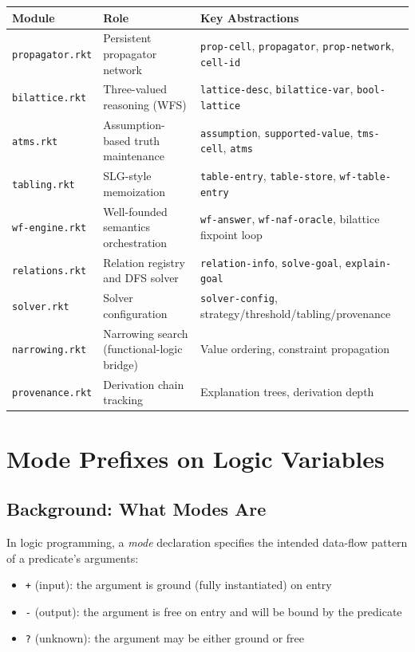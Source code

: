 \documentclass[11pt]{article}
\begin{document}
\begin{center}
\begin{tabular}{lll}
Module & Role & Key Abstractions\\
\hline
\texttt{propagator.rkt} & Persistent propagator network & \texttt{prop-cell}, \texttt{propagator}, \texttt{prop-network}, \texttt{cell-id}\\
\texttt{bilattice.rkt} & Three-valued reasoning (WFS) & \texttt{lattice-desc}, \texttt{bilattice-var}, \texttt{bool-lattice}\\
\texttt{atms.rkt} & Assumption-based truth maintenance & \texttt{assumption}, \texttt{supported-value}, \texttt{tms-cell}, \texttt{atms}\\
\texttt{tabling.rkt} & SLG-style memoization & \texttt{table-entry}, \texttt{table-store}, \texttt{wf-table-entry}\\
\texttt{wf-engine.rkt} & Well-founded semantics orchestration & \texttt{wf-answer}, \texttt{wf-naf-oracle}, bilattice fixpoint loop\\
\texttt{relations.rkt} & Relation registry and DFS solver & \texttt{relation-info}, \texttt{solve-goal}, \texttt{explain-goal}\\
\texttt{solver.rkt} & Solver configuration & \texttt{solver-config}, strategy/threshold/tabling/provenance\\
\texttt{narrowing.rkt} & Narrowing search (functional-logic bridge) & Value ordering, constraint propagation\\
\texttt{provenance.rkt} & Derivation chain tracking & Explanation trees, derivation depth\\
\end{tabular}
\end{center}
\section{Mode Prefixes on Logic Variables}
\label{sec:org58cbd66}

\subsection{Background: What Modes Are}
\label{sec:org78647e8}

In logic programming, a \emph{mode} declaration specifies the intended data-flow
pattern of a predicate's arguments:

\begin{itemize}
\item \texttt{+} (input): the argument is ground (fully instantiated) on entry
\item \texttt{-} (output): the argument is free on entry and will be bound by the predicate
\item \texttt{?} (unknown): the argument may be either ground or free
\end{itemize}
\end{document}
